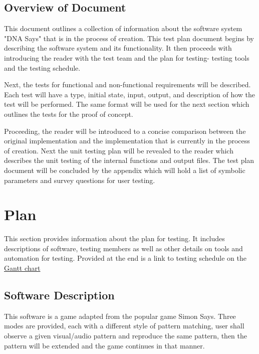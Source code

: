 \documentclass[12pt, titlepage]{article}
\begin{document}
\subsection{Overview of Document}

\par This document outlines a collection of information about the software system "DNA Says" that is in the process of creation. This test plan document begins by describing the software system and its functionality. It then proceeds with introducing the reader with the test team and the plan for testing- testing tools and the testing schedule.
\\
\par Next, the tests for functional and non-functional requirements will be described. Each test will have a type, initial state, input, output, and description of how the test will be performed. The same format will be used for the next section which outlines the tests for the proof of concept.
\\
\par Proceeding, the reader will be introduced to a concise comparison between the original implementation and the implementation that is currently in the process of creation. Next the unit testing plan will be revealed to the reader which describes the unit testing of the internal functions and output files. The test plan document will be concluded by the appendix which will hold a list of symbolic parameters and survey questions for user testing.


\section{Plan}
\par This section provides information about the plan for testing. It includes descriptions of software, testing members as well as other details on tools and automation for testing. Provided at the end is a link to testing schedule on the 
\hyperref[subsec:sched]{Gantt chart}

\subsection{Software Description}
This software is a game adapted from the popular game Simon Says. Three modes are provided, each with a different style of pattern matching, user shall observe a given visual/audio pattern  and reproduce the same pattern, then the pattern will be extended and the game continues in that manner.
\end{document}
